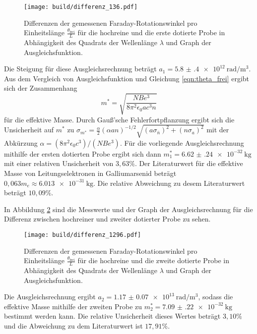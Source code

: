 \begin{figure}[H]
  \centering
  \texttt{[image: build/differenz\_136.pdf]}
  \caption{Differenzen der gemessenen Faraday-Rotationswinkel pro Einheitslänge $\frac{\theta_\text{frei}}{L}$ für die hochreine und die erste dotierte Probe in Abhängigkeit des Quadrats der Wellenlänge $\lambda$ und Graph der Ausgleichsfunktion.}
  \label{fig:differenz136}
\end{figure}

Die Steigung für diese Ausgleichsrechnung beträgt $a_1 = \SI{5.8(4)e12}{\radian\per\cubic\meter}$. Aus dem Vergleich von Ausgleichsfunktion und Gleichung \eqref{eqn:theta_frei} ergibt sich der Zusammenhang
\begin{equation}
  m^{*} = \sqrt{\frac{NBe^3}{8\pi^2 \epsilon_0 a c^3 n}}
\end{equation}
für die effektive Masse. Durch Gauß'sche Fehlerfortpflanzung ergibt sich die Unsicherheit auf $m^{*}$ zu $\sigma_{m^{*}} = \frac{\alpha}{2} (\alpha a n)^{-1/2} \sqrt{(a \sigma_{\bar{n}})^2+(n \sigma_a)^2}$ mit der Abkürzung $\alpha = (8\pi^2 \epsilon_0 c^3)/(N B e^3)$.
Für die vorliegende Ausgleichsrechnung mithilfe der ersten dotierten Probe ergibt sich dann $m^{*}_1 = \SI{6.62(24)e-32}{\kilo\gram}$ mit einer relativen Unsicherheit von $3{,}63\%$.
Der Literaturwert für die effektive Masse von Leitungselektronen in Galliumarsenid beträgt $0{,}063 m_e \approx \SI{6.013e-31}{\kilo\gram}$\cite{effm}. Die relative Abweichung zu desem Literaturwert beträgt $10{,}09\%$.

In Abbildung \ref{fig:differenz1296} sind die Messwerte und der Graph der Ausgleichsrechnung für die Differenz zwischen hochreiner und zweiter dotierter Probe zu sehen.

\begin{figure}[H]
  \centering
  \texttt{[image: build/differenz\_1296.pdf]}
  \caption{Differenzen der gemessenen Faraday-Rotationswinkel pro Einheitslänge $\frac{\theta_\text{frei}}{L}$ für die hochreine und die zweite dotierte Probe in Abhängigkeit des Quadrats der Wellenlänge $\lambda$ und Graph der Ausgleichsfunktion.}
  \label{fig:differenz1296}
\end{figure}

Die Ausgleichsrechnung ergibt $a_2 = \SI{1.17(7)e13}{\radian\per\cubic\meter}$, sodass die effektive Masse mithilfe der zweiten Probe zu $m^{*}_2 = \SI{7.09(22)e-32}{\kilo\gram}$ bestimmt werden kann. Die relative Unsicherheit dieses Wertes beträgt $3{,}10\%$ und die Abweichung zu dem Literaturwert ist $17{,}91\%$.

